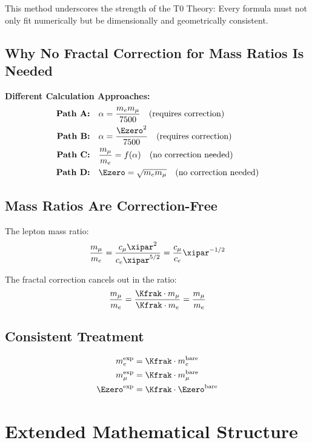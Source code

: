	This method underscores the strength of the T0 Theory: Every formula must not only fit numerically but be dimensionally and geometrically consistent.	
	\subsection{Why No Fractal Correction for Mass Ratios Is Needed}
	
	\begin{foundation}
		\textbf{Different Calculation Approaches:}
		\begin{align}
			\textbf{Path A:} &\quad \alpha = \frac{m_e m_\mu}{7500} \quad \text{(requires correction)} \\
			\textbf{Path B:} &\quad \alpha = \frac{\Ezero^2}{7500} \quad \text{(requires correction)} \\
			\textbf{Path C:} &\quad \frac{m_\mu}{m_e} = f(\alpha) \quad \text{(no correction needed)} \\
			\textbf{Path D:} &\quad \Ezero = \sqrt{m_e m_\mu} \quad \text{(no correction needed)}
		\end{align}
	\end{foundation}
	
	\subsection{Mass Ratios Are Correction-Free}
	
	The lepton mass ratio:
	\[
	\frac{m_\mu}{m_e} = \frac{c_\mu \xipar^2}{c_e \xipar^{5/2}} = \frac{c_\mu}{c_e} \xipar^{-1/2}
	\]
	
	The fractal correction cancels out in the ratio:
	\[
	\frac{m_\mu}{m_e} = \frac{\Kfrak \cdot m_\mu}{\Kfrak \cdot m_e} = \frac{m_\mu}{m_e}
	\]
	
	\subsection{Consistent Treatment}
	
	\begin{align}
		m_e^{\text{exp}} &= \Kfrak \cdot m_e^{\text{bare}} \\
		m_\mu^{\text{exp}} &= \Kfrak \cdot m_\mu^{\text{bare}} \\
		\Ezero^{\text{exp}} &= \Kfrak \cdot \Ezero^{\text{bare}}
	\end{align}
	
	\section{Extended Mathematical Structure}
	
